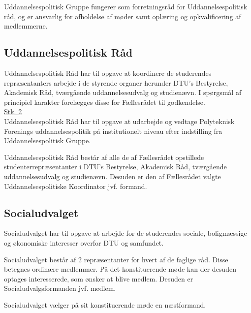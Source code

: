 \begin{list}
\item Uddannelsespolitisk Gruppe fungerer som forretningsråd for Uddannelsespolitisk råd, og er ansvarlig for afholdelse af møder samt oplæring og opkvalificering af medlemmerne.\\

\subsection{Uddannelsespolitisk Råd}
\label{L:kap:upr}
\item Uddannelsespolitisk Råd har til opgave at koordinere de studerendes repræsentanters arbejde i de styrende organer herunder DTU’s Bestyrelse, Akademisk Råd, tværgående uddannelsesudvalg og studienævn. I spørgsmål af principiel karakter forelægges disse for Fællesrådet til godkendelse.\\

\underline{Stk. 2}\\
Uddannelsespolitisk Råd har til opgave at udarbejde og vedtage Polyteknisk Forenings uddannelsespolitik på institutionelt niveau efter indstilling fra Uddannelsespolitisk Gruppe.\\

\item Uddannelsespolitisk Råd består af alle de af Fællesrådet opstillede studenterrepræsentanter i DTU’s Bestyrelse, Akademisk Råd, tværgående uddannelsesudvalg og studienævn. Desuden er den af Fællesrådet valgte Uddannelsespolitiske Koordinator jvf.  formand.\\

\subsection{Socialudvalget}
\label{L:kap:socialudvalg}
\item Socialudvalget har til opgave at arbejde for de studerendes sociale, boligmæssige og økonomiske interesser overfor DTU og samfundet.\\

\item Socialudvalget består af 2 repræsentanter for hvert af de faglige råd. Disse betegnes ordinære medlemmer. På det konstituerende møde kan der desuden optages interesserede, som ønsker at blive medlem. Desuden er Socialudvalgsformanden jvf.  medlem.\\

\item Socialudvalget vælger på sit konstituerende møde en næstformand.\\


\end{list}
